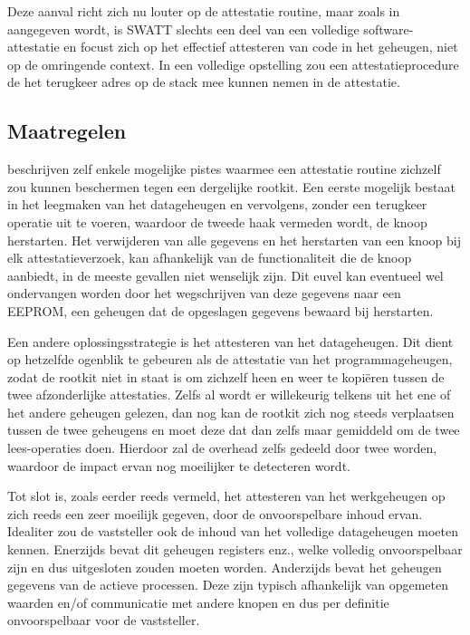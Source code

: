 Deze aanval richt zich nu louter op de attestatie routine, maar zoals in
\citep{perrig2010refutation} aangegeven wordt, is SWATT slechts een deel van
een volledige software-attestatie en focust zich op het effectief attesteren
van code in het geheugen, niet op de omringende context. In een volledige
opstelling zou een attestatieprocedure de het terugkeer adres op de stack mee
kunnen nemen in de attestatie.

\subsection{Maatregelen}

\citep{castelluccia2009difficulty} beschrijven zelf enkele mogelijke pistes
waarmee een attestatie routine zichzelf zou kunnen beschermen tegen een
dergelijke rootkit. Een eerste mogelijk bestaat in het leegmaken van het
datageheugen en vervolgens, zonder een terugkeer operatie uit te voeren,
waardoor de tweede haak vermeden wordt, de knoop herstarten. Het verwijderen
van alle gegevens en het herstarten van een knoop bij elk attestatieverzoek,
kan afhankelijk van de functionaliteit die de knoop aanbiedt, in de meeste
gevallen niet wenselijk zijn. Dit euvel kan eventueel wel ondervangen worden
door het wegschrijven van deze gegevens naar een EEPROM, een geheugen dat de
opgeslagen gegevens bewaard bij herstarten.

Een andere oplossingsstrategie is het attesteren van het datageheugen. Dit
dient op hetzelfde ogenblik te gebeuren als de attestatie van het
programmageheugen, zodat de rootkit niet in staat is om zichzelf heen en weer
te kopi\"eren tussen de twee afzonderlijke attestaties. Zelfs al wordt er
willekeurig telkens uit het ene of het andere geheugen gelezen, dan nog kan de
rootkit zich nog steeds verplaatsen tussen de twee geheugens en moet deze dat
dan zelfs maar gemiddeld om de twee lees-operaties doen. Hierdoor zal de
overhead zelfs gedeeld door twee worden, waardoor de impact ervan nog
moeilijker te detecteren wordt.

Tot slot is, zoals eerder reeds vermeld, het attesteren van het werkgeheugen op
zich reeds een zeer moeilijk gegeven, door de onvoorspelbare inhoud ervan.
Idealiter zou de vaststeller ook de inhoud van het volledige datageheugen
moeten kennen. Enerzijds bevat dit geheugen registers enz., welke volledig
onvoorspelbaar zijn en dus uitgesloten zouden moeten worden. Anderzijds bevat
het geheugen gegevens van de actieve processen. Deze zijn typisch afhankelijk
van opgemeten waarden en/of communicatie met andere knopen en dus per definitie
onvoorspelbaar voor de vaststeller.

